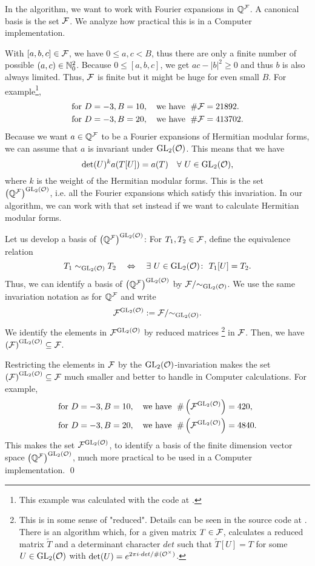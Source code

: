 \begin{remark}
\label{remark:reducedCurlF}
In the algorithm, we want to work with Fourier expansions in $\mathbb{Q}^{\mathcal{F}}$. A canonical basis is the set $\mathcal{F}$. We analyze how practical this is in a Computer implementation.

With $[a,b,c] \in \mathcal{F}$, we have $0\le a,c<B$, thus there are only a finite number of possible $(a,c) \in \mathbb{N}_0^2$. Because $0 \le [a,b,c]$, we get $ac - \left| b \right|^2 \ge 0$ and thus $b$ is also always limited. Thus, $\mathcal{F}$ is finite but it might be huge for even small $B$.
For example\footnote{ This example was calculated with the code at \cite{Zeyer13Github}.},
\begin{align*}
& \text{for } D=-3, B=10,\quad \text{we have } \; \# \mathcal{F} = 21892. \\
& \text{for } D=-3, B=20,\quad \text{we have } \; \# \mathcal{F} = 413702.
\end{align*}
%
Because we want $a \in \mathbb{Q}^{\mathcal{F}}$ to be a Fourier expansions of Hermitian modular forms, we can assume that $a$ is invariant under $\operatorname{GL}_2(\mathcal{O})$. This means that we have
\[ \det(U)^k a(T[U]) = a(T) \quad \forall\ U \in \operatorname{GL}_2(\mathcal{O}) , \]
where $k$ is the weight of the Hermitian modular forms.
This is the set ${\left(\mathbb{Q}^{\mathcal{F}}\right)}^{\operatorname{GL}_2(\mathcal{O})}$, i.e. all the Fourier expansions which satisfy this invariation. In our algorithm, we can work with that set instead if we want to calculate Hermitian modular forms.

Let us develop a basis of ${\left(\mathbb{Q}^{\mathcal{F}}\right)}^{\operatorname{GL}_2(\mathcal{O})}$: For $T_1, T_2 \in \mathcal{F}$, define the equivalence relation
\[ T_1 \sim_{\operatorname{GL}_2(\mathcal{O})} T_2 \quad \Leftrightarrow \quad \exists\ U \in \operatorname{GL}_2(\mathcal{O}) \colon\ T_1[U] = T_2. \]
Thus, we can identify a basis of ${\left(\mathbb{Q}^{\mathcal{F}}\right)}^{\operatorname{GL}_2(\mathcal{O})}$ by $\mathcal{F} / { \sim_{\operatorname{GL}_2(\mathcal{O})} }$.
We use the same invariation notation as for $\mathbb{Q}^{\mathcal{F}}$ and write
\[ {\mathcal{F}}^{\operatorname{GL}_2(\mathcal{O})} := \mathcal{F} / { \sim_{\operatorname{GL}_2(\mathcal{O})} } . \]
We identify the elements in ${\mathcal{F}}^{\operatorname{GL}_2(\mathcal{O})}$ by reduced matrices%
\footnote{
This is in some sense of "reduced". Details can be seen in the source code at \cite{Zeyer13Github}. There is an algorithm which, for a given matrix $T \in \mathcal{F}$, calculates a reduced matrix $\tilde{T}$ and a determinant character $det$ such that $\tilde{T}[U] = T$ for some $U \in \operatorname{GL}_2(\mathcal{O})$ with $\det(U) = e^{2 \pi i \cdot det / {\#(\mathcal{O}^\times)}}$.
}
in $\mathcal{F}$. Then, we have ${\left(\mathcal{F}\right)}^{\operatorname{GL}_2(\mathcal{O})} \subseteq \mathcal{F}$.

Restricting the elements in $\mathcal{F}$ by the $\operatorname{GL}_2(\mathcal{O})$-invariation makes the set ${\left(\mathcal{F}\right)}^{\operatorname{GL}_2(\mathcal{O})} \subseteq \mathcal{F}$ much smaller and better to handle in Computer calculations.
For example,
\begin{align*}
& \text{for } D=-3, B=10,\quad \text{we have } \; \# \left({\mathcal{F}}^{\operatorname{GL}_2(\mathcal{O})}\right) = 420, \\
& \text{for } D=-3, B=20,\quad \text{we have } \; \# \left({\mathcal{F}}^{\operatorname{GL}_2(\mathcal{O})}\right) = 4840.
\end{align*}
%
This makes the set ${\mathcal{F}}^{\operatorname{GL}_2(\mathcal{O})}$, to identify a basis of the finite dimension vector space ${\left(\mathbb{Q}^{\mathcal{F}}\right)}^{\operatorname{GL}_2(\mathcal{O})}$, much more practical to be used in a Computer implementation.
\qed
\end{remark}

